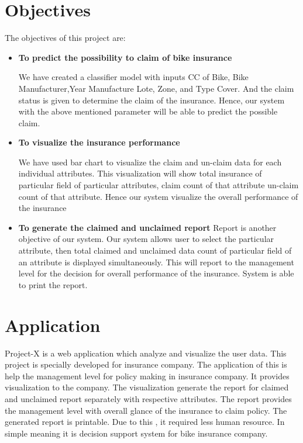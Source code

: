 \section{Objectives}\label{sec:obj}
The objectives of this project are:
\begin{itemize}
\item \textbf{To predict the possibility to claim of bike insurance}
\par 
\par We have created a classifier model with inputs CC of Bike, Bike Manufacturer,Year Manufacture Lote, Zone, and Type Cover. And the claim status is given to determine the claim of the insurance. Hence, our system with the above mentioned parameter will be able to predict the possible claim.
\item \textbf{To visualize the insurance performance} 
\par 
We have used bar chart to visualize the claim and un-claim data for each individual attributes. This visualization will show total insurance of particular field of particular attributes, claim count of that attribute un-claim count of that attribute. Hence our system visualize the overall performance of the insurance
\item \textbf{To generate the claimed and unclaimed report}
Report is another objective of our system. Our system allows user to select the particular attribute, then total claimed and unclaimed data count of particular field of an attribute is displayed simultaneously. This will report to the management level for the decision for overall performance of the insurance. System is able to print the report.
\end{itemize}

\section{Application}
Project-X is a web application which analyze and visualize the user data. This project is specially developed for insurance company. The application of this is help the  management level for policy making in insurance company. It provides visualization to the company. The visualization generate the report for claimed and unclaimed report separately with respective attributes. The report provides the management level with overall glance of the insurance to claim policy. The generated report is printable. Due to this , it required less human resource. In simple meaning it is decision support system for bike insurance company.

